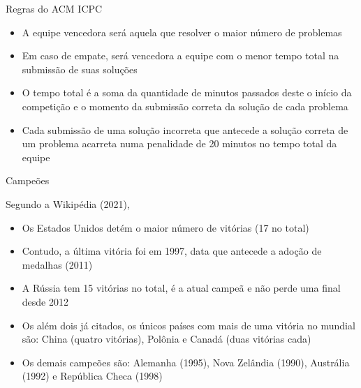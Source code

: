 \begin{frame}[fragile]{Regras do ACM ICPC}

    \begin{itemize}
        \item A equipe vencedora será aquela que resolver o maior número de problemas
        \item Em caso de empate, será vencedora a equipe com o menor tempo total na
        submissão de suas soluções
        \item O tempo total é a soma da quantidade de minutos passados deste o início da
        competição e o momento da submissão correta da solução de cada problema
        \item Cada submissão de uma solução incorreta que antecede a
        solução correta de um problema acarreta numa penalidade de 20 minutos no tempo total da
        equipe
    \end{itemize}

\end{frame}

\begin{frame}[fragile]{Campeões}

    Segundo a Wikipédia (2021),

    \begin{itemize}
        \item Os Estados Unidos detém o maior número de vitórias (17 no total)
        \item Contudo, a última vitória foi em 1997, data que antecede a adoção de medalhas (2011)
        \item A Rússia tem 15 vitórias no total, é a atual campeã e não perde uma final desde
            2012
        \item Os além dois já citados, os únicos países com mais de uma vitória no mundial são:
            China (quatro vitórias), Polônia e Canadá (duas vitórias cada)
        \item Os demais campeões são: Alemanha (1995), Nova Zelândia (1990), Austrália (1992)  e
            República Checa (1998)
    \end{itemize}

\end{frame}
